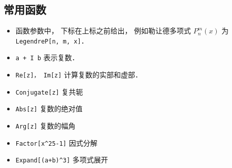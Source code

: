 \subsection{常用函数}
\begin{itemize}
\item 函数参数中， 下标在上标之前给出， 例如勒让德多项式 $P_n^m(x)$ 为 \verb|LegendreP[n, m, x]|．
\item \verb|a + I b| 表示复数．
\item \verb|Re[z]， Im[z]| 计算复数的实部和虚部．
\item \verb|Conjugate[z]| 复共轭
\item \verb|Abs[z]| 复数的绝对值
\item \verb|Arg[z]| 复数的幅角
\item \verb|Factor[x^25-1]| 因式分解
\item \verb|Expand[(a+b)^3]| 多项式展开
\end{itemize}

